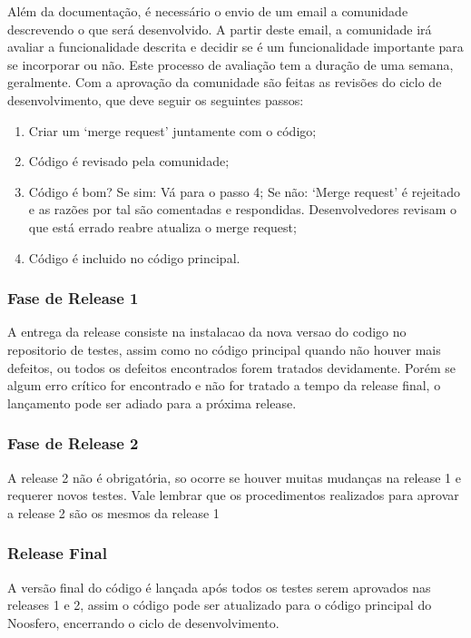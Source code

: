 
Além da documentação, é necessário o envio de um email a comunidade descrevendo o 
que será desenvolvido. A partir deste email, a comunidade irá avaliar a funcionalidade 
descrita e decidir se é um funcionalidade importante para se incorporar ou não. 
Este processo de avaliação tem a duração de uma semana, geralmente.%
%
Com a aprovação da comunidade são feitas as revisões do ciclo de desenvolvimento, 
que deve seguir os seguintes passos:
%
\begin{enumerate}
\item Criar um ‘merge request’ juntamente com o código;
\item Código é revisado pela comunidade;
\item Código é bom? 
\subitem Se sim:
\subsubitem Vá para o passo 4;
\subitem Se não:
\subsubitem ‘Merge request’ é rejeitado e as razões por tal são comentadas e 
respondidas.
\subsubitem Desenvolvedores revisam o que está errado reabre atualiza o merge 
request;
\item Código é incluido no código principal.
\end{enumerate}
\subsubsection{Fase de Release 1}
%
A entrega da release consiste na instalacao da nova versao do codigo no repositorio 
de testes, assim como no código principal quando não houver mais defeitos, ou todos 
os defeitos encontrados forem tratados devidamente. Porém se algum erro crítico for 
encontrado e não for tratado a tempo da release final, o lançamento pode ser adiado 
para a próxima release.%
%
\subsubsection{Fase de Release 2}
%
A release 2 não é obrigatória, so ocorre se houver muitas mudanças na release 1 e 
requerer novos testes. Vale lembrar que os procedimentos realizados para aprovar a 
release 2 são os mesmos da release 1%
%
\subsubsection{Release Final}
%
A versão final do código é lançada após todos os testes serem aprovados nas releases 
1 e 2, assim o código pode ser atualizado para o código principal do Noosfero, 
encerrando o ciclo de desenvolvimento.%

